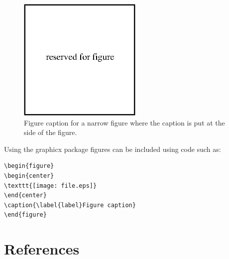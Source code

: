 \documentclass[a4paper]{jpconf}
\begin{document}
\begin{figure}[h]
\includegraphics[width=14pc]{name.eps}\hspace{2pc}%
\begin{minipage}[b]{14pc}\caption{\label{label}Figure caption for a narrow figure where the caption is put at the side of the figure.}
\end{minipage}
\end{figure}

Using the graphicx package figures can be included using code such as:
\begin{verbatim}
\begin{figure}
\begin{center}
\texttt{[image: file.eps]}
\end{center}
\caption{\label{label}Figure caption}
\end{figure}
\end{verbatim}

\section*{References}


\end{document}
